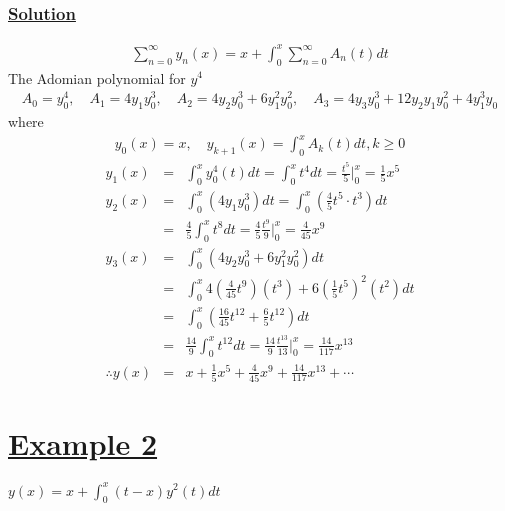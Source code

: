\documentclass[11pt]{report}
\newcommand{\ubt}[1]{\textbf{\underline{#1}}}
\newcommand{\sps}{\\[0.2cm]}
\newcommand{\dsp}{\displaystyle}
\newcommand{\example}[1]{\section*{\ubt{Example #1}}}
\newcommand{\solution}{\subsubsection{\ubt{Solution}}}
\begin{document}
	\solution
		\begin{eqnarray*}
			\sum_{n=0}^{\infty} y_n(x) = x+ \int_0^x \sum_{n=0}^{\infty} A_n(t)dt
		\end{eqnarray*}
		The Adomian polynomial for $y^4$
		\begin{eqnarray*}
			A_0 = y_0^4,\quad A_1 = 4y_1y_0^3,\quad A_2 = 4y_2y_0^3 + 6y_1^2y_0^2,\quad A_3 = 4y_3y_0^3 + 12y_2y_1y_0^2 + 4y_1^3y_0
		\end{eqnarray*}
		where
		\begin{eqnarray*}
				y_0(x) = x,\quad y_{k+1}(x) = \int_0^x A_k(t)dt, k\geq 0
		\end{eqnarray*}
		\begin{eqnarray*}
			y_1(x) &=& \int_0^x y_0^4(t)dt = \int_0^x t^4 dt = \frac{t^5}{5}\Bigg|_0^x = \frac{1}{5}x^5\sps
			y_2(x) &=& \int_0^x(4y_1y_0^3)dt = \int_0^x\left(\frac{4}{5}t^5 \cdot t^3\right)dt\sps
			&=& \frac{4}{5}\int_0^x t^8 dt = \frac{4}{5}\frac{t^9}{9}\Bigg|_0^x = \frac{4}{45}x^9\sps
			y_3(x) &=& \int_0^x \left(4y_2y_0^3 + 6y_1^2y_0^2\right)dt\sps
			&=& \int_0^x 4\left(\frac{4}{45}t^9\right)\left(t^3\right) + 6\left(\frac{1}{5}t^5\right)^2\left(t^2\right)dt\sps
			&=& \int_0^x\left(\frac{16}{45}t^{12} + \frac{6}{5}t^{12}\right)dt\sps
			&=& \frac{14}{9}\int_0^x t^{12} dt = \frac{14}{9}\frac{t^{13}}{13}\Bigg|_0^x = \frac{14}{117}x^{13}\sps
			\therefore y(x) &=& x + \frac{1}{5}x^5 + \frac{4}{45}x^9 + \frac{14}{117}x^{13} + \cdots
		\end{eqnarray*}
		
		\example{2}
		$\dsp y(x) = x + \int_0^x (t-x) y^2(t)dt$
		
\end{document}
